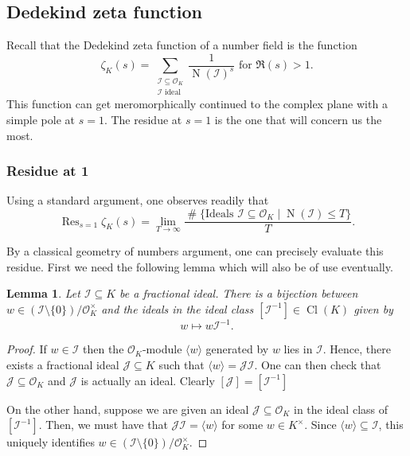 \documentclass[a4paper]{article}
\newtheorem{lemma}[theorem]{Lemma}
\theoremstyle{definition}
\theoremstyle{remark}
\DeclareMathOperator{\Res}{Res}
\DeclareMathOperator{\card}{\#}
\DeclareMathOperator{\N}{N}
\DeclareMathOperator{\Cl}{Cl}
\newcommand{\OK}{\mathcal{O}_K}
\begin{document}
\subsection{Dedekind zeta function}

Recall that the Dedekind zeta function of a number field is the function
\begin{equation}
\zeta_K(s) = 
\sum_{\substack{\mathcal{I} \subseteq \OK \\ \mathcal{I} \text{ ideal}}} 
\frac{1}{\N(\mathcal{I})^{s}} \text{ for }\Re(s) > 1.
\end{equation}
This function can get meromorphically continued to the complex plane with a simple pole at {$s=1$}. The residue at {$s=1$} is the one that will concern us the most.


\subsubsection{Residue at 1}
Using a standard argument, one observes readily that  
\begin{equation}
   \Res_{s=1} \zeta_K(s)
	 = 
	  \lim_{T \rightarrow \infty}\frac{ \card \{\text{Ideals }\mathcal{I} \subseteq \OK \mid \N(\mathcal{I}) \leq T \}  }{T}.
\end{equation}

By a classical 
geometry of numbers argument, one can precisely evaluate this residue. First we need the following lemma which will also be of use eventually.
\begin{lemma}
	\label{le:counting_ideals}
	Let $\mathcal{I} \subseteq K$ be a fractional ideal.
	There is a bijection between $w \in (\mathcal{I}\setminus \{0\}) / \OK^{\times}$ and the ideals in the ideal class $[\mathcal{I}^{-1}] \in \Cl(K)$ given by 
	\begin{equation}
	  w \mapsto  w \mathcal{I}^{-1}.
	\end{equation}
\end{lemma}
\begin{proof}
	If $w \in \mathcal{I}$ then the $\OK$-module $\langle w \rangle$ generated by $w$ lies in $\mathcal{I}$. 
	Hence, there exists a fractional ideal $\mathcal{J} \subseteq K$ such that $ \langle w \rangle  = \mathcal{J}\mathcal{I}$. 
	One can then check that $\mathcal{J} \subseteq \OK$ and $\mathcal{J}$ is actually an ideal. Clearly $[\mathcal{J}] = [\mathcal{I}^{-1}]$

	On the other hand, suppose we are given an ideal $\mathcal{J}\subseteq \OK$ in the ideal class of $[\mathcal{I}^{-1}]$. Then, we must have that $\mathcal{J}\mathcal{I} = \langle w \rangle$ for some $w \in K^{\times}$. Since $\langle w \rangle \subseteq  \mathcal{I}$, this uniquely identifies $w \in (\mathcal{I} \setminus \{0\})/ \OK^{\times}$.
\end{proof}
\end{document}

